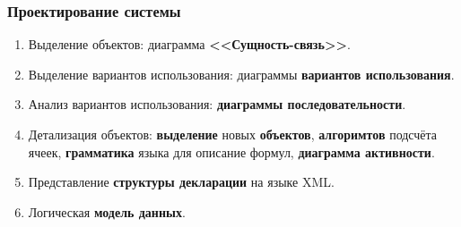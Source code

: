\documentclass[xcolor=pdftex, dvipsnames, table]{beamer}
\begin{document}
\begin{frame}
  \frametitle{Проектирование системы}
  \begin{enumerate}
    \item Выделение объектов: диаграмма \textbf{<<Сущность-связь>>}.
    \item Выделение вариантов использования: диаграммы \textbf{вариантов использования}.
    \item Анализ вариантов использования: \textbf{диаграммы последовательности}.
    \item Детализация объектов: \textbf{выделение} новых \textbf{объектов}, \textbf{алгоримтов} подсчёта ячеек, \textbf{грамматика} языка для описание формул, \textbf{диаграмма активности}.
    \item Представление \textbf{структуры декларации} на языке XML.
    \item Логическая \textbf{модель данных}.
  \end{enumerate}
\end{frame}
\end{document}
